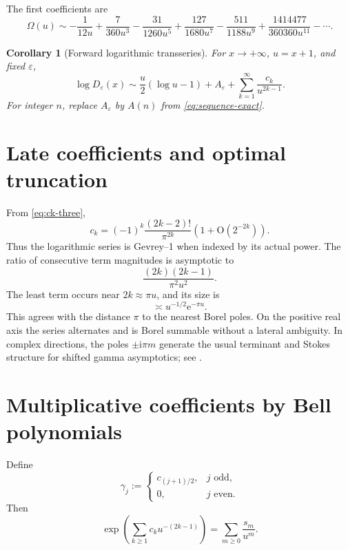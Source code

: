 \documentclass[11pt,a4paper,oneside]{book}
\newtheorem{corollary}[theorem]{Corollary}
\newcommand{\e}{\mathrm e}
\newcommand{\ii}{\mathrm i}
\newcommand{\Ord}{\mathrm O}
\newcommand{\eps}{\varepsilon}
\begin{document}
The first coefficients are
\begin{equation}\label{eq:c-first}
 \Omega(u)\sim
 -\frac{1}{12u}
 +\frac{7}{360u^3}
 -\frac{31}{1260u^5}
 +\frac{127}{1680u^7}
 -\frac{511}{1188u^9}
 +\frac{1414477}{360360u^{11}}
 -\cdots.
\end{equation}

\begin{corollary}[Forward logarithmic transseries]\label{cor:forward-log}
For \(x\to+\infty\), \(u=x+1\), and fixed \(\eps\),
\begin{equation}\label{eq:logD-final}
 \boxed{
 \log D_\eps(x)
 \sim
 \frac{u}{2}(\log u-1)+A_\eps
 +\sum_{k=1}^\infty\frac{c_k}{u^{2k-1}}.}
\end{equation}
For integer \(n\), replace \(A_\eps\) by \(A(n)\) from
\cref{eq:sequence-exact}.
\end{corollary}

\section{Late coefficients and optimal truncation}

From \cref{eq:ck-three},
\begin{equation}\label{eq:ck-late}
 c_k
 =(-1)^k\frac{(2k-2)!}{\pi^{2k}}
 \left(1+\Ord(2^{-2k})\right).
\end{equation}
Thus the logarithmic series is Gevrey--1 when indexed by its actual power.
The ratio of consecutive term magnitudes is asymptotic to
\[
 \frac{(2k)(2k-1)}{\pi^2u^2}.
\]
The least term occurs near \(2k\approx\pi u\), and its size is
\begin{equation}\label{eq:least-term}
 \asymp u^{-1/2}\e^{-\pi u}.
\end{equation}
This agrees with the distance \(\pi\) to the nearest Borel poles.  On the
positive real axis the series alternates and is Borel summable without a
lateral ambiguity.  In complex directions, the poles
\(\pm\ii\pi m\) generate the usual terminant and Stokes structure for shifted
gamma asymptotics; see \cite{Nemes2015,ParisKaminski,Olver}.

\section{Multiplicative coefficients by Bell polynomials}

Define
\begin{equation}\label{eq:gamma-j}
 \gamma_j:=
 \begin{cases}
  c_{(j+1)/2},&j\text{ odd},\\
  0,&j\text{ even}.
 \end{cases}
\end{equation}
Then
\[
 \exp\!\left(\sum_{k\ge1}c_ku^{-(2k-1)}\right)
 =\sum_{m\ge0}\frac{s_m}{u^m}.
\]
\end{document}
